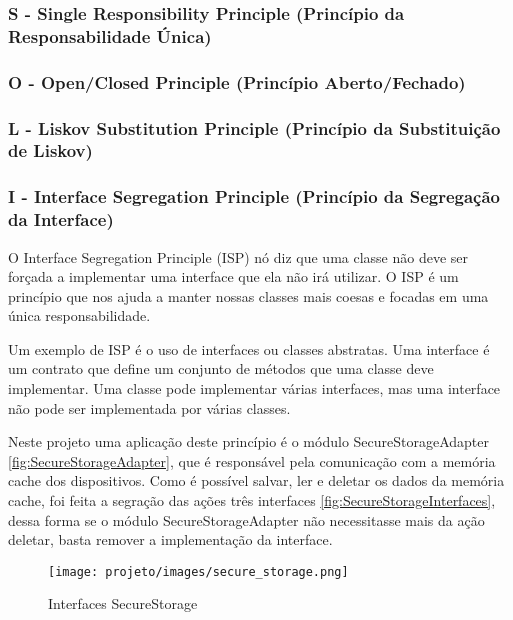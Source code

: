 \documentclass[12pt]{article}
\begin{document}
\subsubsection{S - Single Responsibility Principle (Princípio da Responsabilidade Única)}
\label{SRP}
\lipsum[1]

\subsubsection{O - Open/Closed Principle (Princípio Aberto/Fechado)}
\label{OCP}
\lipsum[1]

\subsubsection{L - Liskov Substitution Principle (Princípio da Substituição de Liskov)}
\label{LSP}
\lipsum[1]

\subsubsection{I - Interface Segregation Principle (Princípio da Segregação da Interface)}
\label{ISP}
O Interface Segregation Principle (ISP) nó diz que uma classe não deve ser forçada a implementar uma interface que ela não irá utilizar. O ISP é um princípio que nos ajuda a manter nossas classes mais coesas e focadas em uma única responsabilidade.

Um exemplo de ISP  é o uso de interfaces ou classes abstratas. Uma interface é um contrato que define um conjunto de métodos que uma classe deve implementar. Uma classe pode implementar várias interfaces, mas uma interface não pode ser implementada por várias classes.

Neste projeto uma aplicação deste princípio é o módulo SecureStorageAdapter \autoref{fig:SecureStorageAdapter}, que é responsável pela comunicação com a memória cache dos dispositivos. Como é possível salvar, ler e deletar os dados da memória cache, foi feita a segração das ações três interfaces \autoref{fig:SecureStorageInterfaces}, dessa forma se o módulo SecureStorageAdapter não necessitasse mais da ação deletar, basta remover a implementação da interface. 

\begin{figure}[!ht]
  \centering
  \texttt{[image: projeto/images/secure\_storage.png]}
  \caption{Interfaces SecureStorage}
  \label{fig:SecureStorageInterfaces}
\end{figure}
\end{document}
